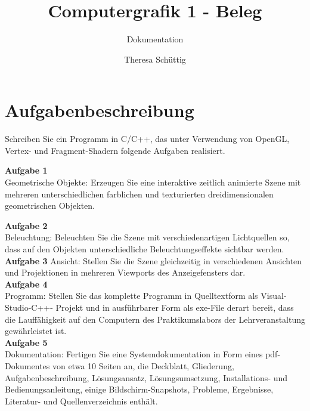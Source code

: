 \documentclass{scrartcl}
\begin{document}
    \begin{titlepage}
        \title{Computergrafik 1 - Beleg}
        \subtitle{Dokumentation}
        \author{Theresa Schüttig}
        \maketitle
    \end{titlepage}

    \tableofcontents
    \newpage

    \section{Aufgabenbeschreibung}

        Schreiben Sie ein Programm in C/C++, das unter Verwendung von OpenGL, Vertex- und
        Fragment-Shadern folgende Aufgaben realisiert. \newline


        \textbf{Aufgabe 1} \\
        Geometrische Objekte: Erzeugen Sie eine interaktive zeitlich animierte Szene mit mehreren
        unterschiedlichen farblichen und texturierten dreidimensionalen geometrischen Objekten. \newline

        \textbf{Aufgabe 2} \\
        Beleuchtung: Beleuchten Sie die Szene mit verschiedenartigen Lichtquellen so, dass auf den
        Objekten unterschiedliche Beleuchtungseffekte sichtbar werden. \\

        \textbf{Aufgabe 3}
        Ansicht: Stellen Sie die Szene gleichzeitig in verschiedenen Ansichten und Projektionen in
        mehreren Viewports des Anzeigefensters dar. \\

        \textbf{Aufgabe 4} \\
        Programm: Stellen Sie das komplette Programm in Quelltextform als Visual-Studio-C++-
        Projekt und in ausführbarer Form als exe-File derart bereit, dass die Lauffähigkeit auf den
        Computern des Praktikumslabors der Lehrveranstaltung gewährleistet ist. \\

        \textbf{Aufgabe 5} \\
        Dokumentation: Fertigen Sie eine Systemdokumentation in Form eines pdf-Dokumentes von
        etwa 10 Seiten an, die Deckblatt, Gliederung, Aufgabenbeschreibung, Lösungsansatz,
        Lösungsumsetzung, Installations- und Bedienungsanleitung, einige Bildschirm-Snapshots,
        Probleme, Ergebnisse, Literatur- und Quellenverzeichnis enthält. \\
\end{document}
